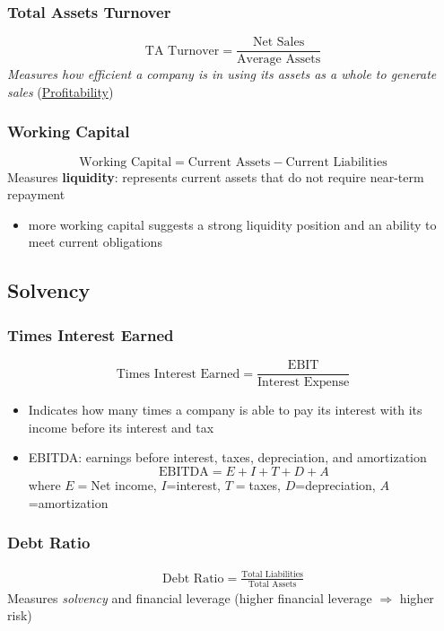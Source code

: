 \documentclass{article}
\begin{document}
\begin{multicols}{2}
\subsubsection{Total Assets Turnover}
$$\text{TA Turnover} = \frac{\text{Net Sales}}{\text{Average Assets}}$$
\textit{Measures how efficient a company is in using its assets as a whole to generate sales} (\underline{Profitability})

\subsubsection{Working Capital}
$$\text{Working Capital} = \text{Current Assets} - \text{Current Liabilities}$$
Measures \textbf{liquidity}: represents current assets that do not require near-term repayment
\begin{itemize}
	\item more working capital suggests a strong liquidity position and an ability to meet current obligations
\end{itemize}

\subsection{Solvency}
\subsubsection{Times Interest Earned}
$$\text{Times Interest Earned} = \frac{\text{EBIT}}{\text{Interest Expense}}$$
\begin{itemize}
	\item Indicates how many times a company is able to pay its interest with its income before its interest and tax
	\item EBITDA: earnings before interest, taxes, depreciation, and amortization
	$$\text{EBITDA} = E + I + T + D + A$$
	where $E=$Net income, $I$=interest, $T=$taxes, $D$=depreciation, $A$=amortization
\end{itemize}
\subsubsection{Debt Ratio}
\begin{equation*}
	\begin{aligned}
		\text{Debt Ratio} = \frac{\text{Total Liabilities}}{\text{Total Assets}}
	\end{aligned}
\end{equation*}
Measures \textit{solvency} and financial leverage (higher financial leverage $\Rightarrow$ higher risk)

\end{multicols}
\end{document}
